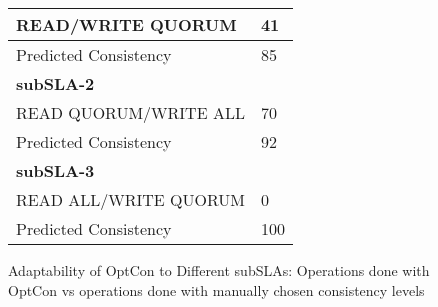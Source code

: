 \documentclass[conference]{IEEEtran}
\begin{document}
\begin{figure*}[!htpb]
{{\begin{tabular}[b]{|l|l|}
READ/WRITE QUORUM     & 41               \\ \hline
Predicted Consistency & 85               \\ \hline
\multicolumn{2}{|l|}{\textbf{subSLA-2}}                              \\ \hline
READ QUORUM/WRITE ALL & 70               \\ \hline
Predicted Consistency & 92               \\ \hline
\multicolumn{2}{|l|}{\textbf{subSLA-3}}                              \\ \hline
READ ALL/WRITE QUORUM & 0                \\ \hline
Predicted Consistency & 100              \\ \hline
\end{tabular}\label{table:mc}}}\hfill
\caption{Adaptability of OptCon to Different subSLAs: Operations done with OptCon vs operations done with manually chosen consistency levels}
\end{figure*}
\end{document}
